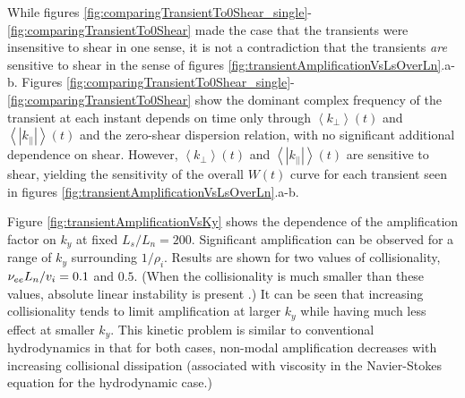 \documentclass{jpp}
\begin{document}
While figures \ref{fig:comparingTransientTo0Shear_single}-\ref{fig:comparingTransientTo0Shear}
made the case that the transients were insensitive to shear in one sense,
it is not a contradiction that the transients \emph{are} sensitive to shear
in the sense of figures \ref{fig:transientAmplificationVsLsOverLn}.a-b.
Figures  \ref{fig:comparingTransientTo0Shear_single}-\ref{fig:comparingTransientTo0Shear}
show the dominant complex frequency of the transient at each instant depends on time
only through $\left<k_{\perp}\right>(t)$
and $\left<|k_{||}|\right>(t)$ and the zero-shear dispersion relation, with
no significant additional dependence on shear.  However,  $\left<k_{\perp}\right>(t)$
and $\left<|k_{||}|\right>(t)$ are sensitive to shear, yielding the sensitivity
of the overall $W(t)$ curve for each transient seen in figures \ref{fig:transientAmplificationVsLsOverLn}.a-b.

Figure \ref{fig:transientAmplificationVsKy} shows the dependence
of the amplification factor on $k_y$ at fixed $L_s/L_n = 200$.
Significant amplification can be observed for a range of $k_y$ surrounding
$1/\rho_i$.
Results are shown for two values of collisionality,
$\nu_{ee} L_n / v_i = 0.1$ and $0.5$.
(When the collisionality is much smaller than these values,
absolute linear instability is present \citep{usUniversalInstability}.)
It can be seen that increasing collisionality tends to limit amplification
at larger $k_y$ while having much less effect at smaller $k_y$.
This kinetic problem is similar to conventional hydrodynamics in that for both cases, non-modal amplification
decreases with increasing collisional dissipation (associated with viscosity in the Navier-Stokes equation
for the hydrodynamic case.)
\end{document}
